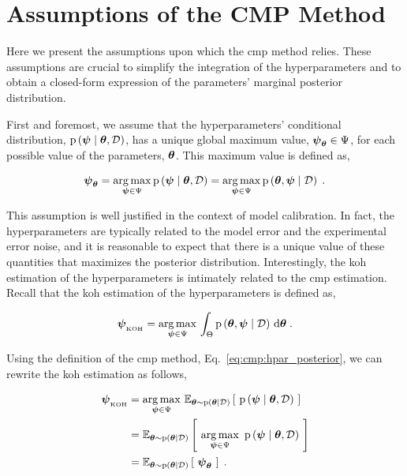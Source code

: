 \section{Assumptions of the CMP Method}
\label{sc:cmp:assumptions}

Here we present the assumptions upon which the \gls{cmp} method relies. These assumptions are crucial to simplify the integration of the hyperparameters and to obtain a closed-form expression of the parameters' marginal posterior distribution. 

\smallskip
First and foremost, we assume that the hyperparameters' conditional distribution, $\mathrm{p} \left( \boldsymbol{\psi} \mid \boldsymbol{\theta}, \mathcal{D} \right)$, has a unique global maximum value, $\boldsymbol{\psi}_{\boldsymbol{\theta}} \in \Psi$, for each possible value of the parameters, $\boldsymbol{\theta}$. This maximum value is defined as,

\begin{equation}
    \boldsymbol{\psi}_{\boldsymbol{\theta}} = \operatorname*{arg\,max}_{\boldsymbol{\psi} \in \Psi} \mathrm{p} \left( \boldsymbol{\psi} \mid \boldsymbol{\theta}, \mathcal{D} \right) = \operatorname*{arg\,max}_{\boldsymbol{\psi} \in \Psi} \mathrm{p} \left( \boldsymbol{\theta}, \boldsymbol{\psi} \mid \mathcal{D} \right) \;.
    \label{eq:cmp:psi_map}
\end{equation}

This assumption is well justified in the context of model calibration. In fact, the hyperparameters are typically related to the model error and the experimental error noise, and it is reasonable to expect that there is a unique value of these quantities that maximizes the posterior distribution. Interestingly, the \gls{koh} estimation of the hyperparameters is intimately related to the \gls{cmp} estimation. Recall that the \gls{koh} estimation of the hyperparameters is defined as,

\begin{equation}
   \boldsymbol{\psi}_{_\text{KOH}} = \operatorname*{arg\,max}_{\boldsymbol{\psi} \in \Psi} \, \int_{\Theta} \mathrm{p} \left( \boldsymbol{\theta}, \boldsymbol{\psi} \mid \mathcal{D} \right) \, \mathrm{d}\boldsymbol{\theta} \;.
\end{equation}

Using the definition of the \gls{cmp} method, Eq.~\eqref{eq:cmp:hpar_posterior}, we can rewrite the \gls{koh} estimation as follows,

\begin{equation}
    \left.
        \begin{aligned}
    \psikoh &=  \argmax_{\bpsi \in \Psi} \, \mathbb{E}_{\btheta \sim \p{\btheta \mid \data}}\left[ \ \p{\bpsi \mid \btheta, \data} \ \right]\\
    &=   \mathbb{E}_{\btheta \sim \p{\btheta \mid \data}}\left[ \ \argmax_{\bpsi \in \Psi} \ \p{\bpsi \mid \btheta, \data} \ \right] \\
    & = \expectation{\btheta \sim \p{\btheta \mid \data}}{\psimap} \;.
        \end{aligned}
    \right.
    \label{eq:koh_hpar}
\end{equation}

